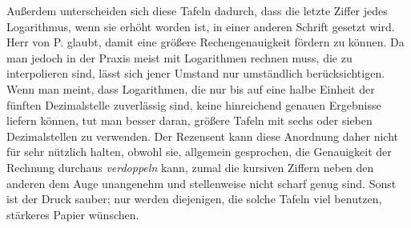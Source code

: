 Außerdem unterscheiden sich diese Tafeln dadurch, dass die letzte Ziffer jedes Logarithmus, wenn sie erhöht worden ist, in einer anderen Schrift gesetzt wird. Herr von P. glaubt, damit eine größere Rechengenauigkeit fördern zu können. Da man jedoch in der Praxis meist mit Logarithmen rechnen muss, die zu interpolieren sind, lässt sich jener Umstand nur umständlich berücksichtigen. Wenn man meint, dass Logarithmen, die nur bis auf eine halbe Einheit der fünften Dezimalstelle zuverlässig sind, keine hinreichend genauen Ergebnisse liefern können, tut man besser daran, größere Tafeln mit sechs oder sieben Dezimalstellen zu verwenden. Der Rezensent kann diese Anordnung daher nicht für sehr nützlich halten, obwohl sie, allgemein gesprochen, die Genauigkeit der 
Rechnung durchaus \emph{verdoppeln} kann, zumal die kursiven Ziffern neben den anderen dem Auge unangenehm und stellenweise nicht scharf genug sind. Sonst ist der Druck sauber; nur werden diejenigen, die solche Tafeln viel benutzen, stärkeres Papier wünschen.

